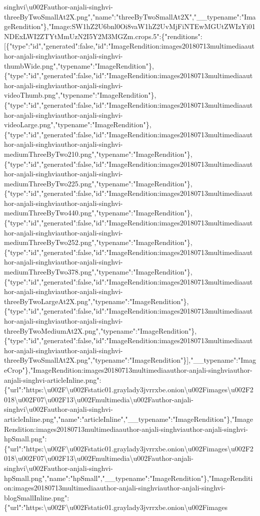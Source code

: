 singhvi\textbackslash{}u002Fauthor-anjali-singhvi-threeByTwoSmallAt2X.png","name":"threeByTwoSmallAt2X","\_\_typename":"ImageRendition"\},"Image:SW1hZ2U6bnl0Oi8vaW1hZ2UvMjFiNTEwMGUtZWIzYi01NDExLWI2ZTYtMmUzN2I5Y2M3MGZm.crops.5":\{"renditions":{[}\{"type":"id","generated":false,"id":"ImageRendition:images20180713multimediaauthor-anjali-singhviauthor-anjali-singhvi-thumbWide.png","typename":"ImageRendition"\},\{"type":"id","generated":false,"id":"ImageRendition:images20180713multimediaauthor-anjali-singhviauthor-anjali-singhvi-videoThumb.png","typename":"ImageRendition"\},\{"type":"id","generated":false,"id":"ImageRendition:images20180713multimediaauthor-anjali-singhviauthor-anjali-singhvi-videoLarge.png","typename":"ImageRendition"\},\{"type":"id","generated":false,"id":"ImageRendition:images20180713multimediaauthor-anjali-singhviauthor-anjali-singhvi-mediumThreeByTwo210.png","typename":"ImageRendition"\},\{"type":"id","generated":false,"id":"ImageRendition:images20180713multimediaauthor-anjali-singhviauthor-anjali-singhvi-mediumThreeByTwo225.png","typename":"ImageRendition"\},\{"type":"id","generated":false,"id":"ImageRendition:images20180713multimediaauthor-anjali-singhviauthor-anjali-singhvi-mediumThreeByTwo440.png","typename":"ImageRendition"\},\{"type":"id","generated":false,"id":"ImageRendition:images20180713multimediaauthor-anjali-singhviauthor-anjali-singhvi-mediumThreeByTwo252.png","typename":"ImageRendition"\},\{"type":"id","generated":false,"id":"ImageRendition:images20180713multimediaauthor-anjali-singhviauthor-anjali-singhvi-mediumThreeByTwo378.png","typename":"ImageRendition"\},\{"type":"id","generated":false,"id":"ImageRendition:images20180713multimediaauthor-anjali-singhviauthor-anjali-singhvi-threeByTwoLargeAt2X.png","typename":"ImageRendition"\},\{"type":"id","generated":false,"id":"ImageRendition:images20180713multimediaauthor-anjali-singhviauthor-anjali-singhvi-threeByTwoMediumAt2X.png","typename":"ImageRendition"\},\{"type":"id","generated":false,"id":"ImageRendition:images20180713multimediaauthor-anjali-singhviauthor-anjali-singhvi-threeByTwoSmallAt2X.png","typename":"ImageRendition"\}{]},"\_\_typename":"ImageCrop"\},"ImageRendition:images20180713multimediaauthor-anjali-singhviauthor-anjali-singhvi-articleInline.png":\{"url":"https:\textbackslash{}u002F\textbackslash{}u002Fstatic01.graylady3jvrrxbe.onion\textbackslash{}u002Fimages\textbackslash{}u002F2018\textbackslash{}u002F07\textbackslash{}u002F13\textbackslash{}u002Fmultimedia\textbackslash{}u002Fauthor-anjali-singhvi\textbackslash{}u002Fauthor-anjali-singhvi-articleInline.png","name":"articleInline","\_\_typename":"ImageRendition"\},"ImageRendition:images20180713multimediaauthor-anjali-singhviauthor-anjali-singhvi-hpSmall.png":\{"url":"https:\textbackslash{}u002F\textbackslash{}u002Fstatic01.graylady3jvrrxbe.onion\textbackslash{}u002Fimages\textbackslash{}u002F2018\textbackslash{}u002F07\textbackslash{}u002F13\textbackslash{}u002Fmultimedia\textbackslash{}u002Fauthor-anjali-singhvi\textbackslash{}u002Fauthor-anjali-singhvi-hpSmall.png","name":"hpSmall","\_\_typename":"ImageRendition"\},"ImageRendition:images20180713multimediaauthor-anjali-singhviauthor-anjali-singhvi-blogSmallInline.png":\{"url":"https:\textbackslash{}u002F\textbackslash{}u002Fstatic01.graylady3jvrrxbe.onion\textbackslash{}u002Fimages